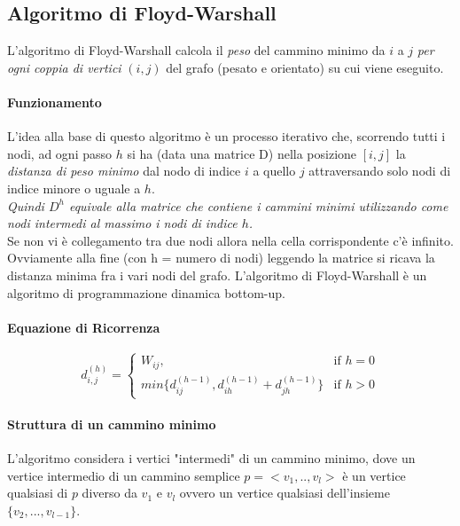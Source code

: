 \documentclass[12pt, a4paper, openany]{book}
\begin{document}
\subsection{Algoritmo di Floyd-Warshall}
L'algoritmo di Floyd-Warshall calcola il \emph{peso} del cammino minimo da $i$ a $j$ \emph{per ogni coppia di vertici} $(i,j)$ del grafo (pesato e orientato) su cui viene eseguito.

\paragraph{Funzionamento}
L'idea alla base di questo algoritmo è un processo iterativo che, scorrendo tutti i nodi, ad ogni passo $h$ si ha
(data una matrice D) nella posizione $[i,j]$ la \emph{distanza di peso minimo} dal nodo di indice $i$ a quello $j$ attraversando solo nodi di indice minore o uguale a $h$.\\
\textit{Quindi $D^h$ equivale alla matrice che contiene i cammini minimi utilizzando come nodi intermedi al massimo i nodi di indice $h$.}
\\Se non vi è collegamento tra due nodi allora nella cella corrispondente c'è infinito.
Ovviamente alla fine (con h = numero di nodi) leggendo la matrice si ricava la distanza minima fra i vari nodi del grafo.
L'algoritmo di Floyd-Warshall è un algoritmo di programmazione dinamica bottom-up.

\paragraph{Equazione di Ricorrenza}

\begin{equation*}
	d^{(h)}_{i,j}= \begin{cases}
		W_{ij},                                                & \text{if $h = 0$} \\
		min\{ d^{(h-1)}_{ij},d^{(h-1)}_{ih} + d^{(h-1)}_{jh}\} & \text{if $h > 0$}
	\end{cases}
\end{equation*}
\paragraph*{Struttura di un cammino minimo}
L'algoritmo considera i vertici "intermedi" di un cammino minimo, dove un vertice intermedio di un cammino semplice $p=<v_1,..,v_l>$
è un vertice qualsiasi di $p$ diverso da $v_1$ e $v_l$ ovvero un vertice qualsiasi dell'insieme $\{v_2,...,v_{l-1}\}$.
\end{document}
